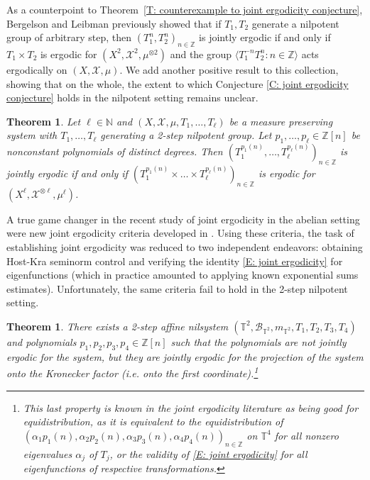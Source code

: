 \documentclass[11pt]{amsart}
\newtheorem{theorem}[lemma]{Theorem}
\theoremstyle{definition}
\newcommand{\N}{{\mathbb N}}
\newcommand{\T}{{\mathbb T}}
\newcommand{\Z}{{\mathbb Z}}
\newcommand{\CB}{{\mathcal B}}
\newcommand{\CX}{{\mathcal X}}
\newcommand{\1}{{\mathbf{1}}}
\begin{document}
As a counterpoint to Theorem~\ref{T: counterexample to joint ergodicity conjecture}, Bergelson and Leibman \cite[Theorem~B]{BL02} previously showed that if $T_{1},T_{2}$ generate a nilpotent group of arbitrary step, then $(T_{1}^{n},T_{2}^{n})_{n\in\Z}$ is jointly ergodic if and only if $T_{1}\times T_{2}$ is ergodic for $(X^{2},\mathcal{X}^{2},\mu^{\otimes 2})$ and the group $\langle T_{1}^{-n}T_{2}^{n}\colon n\in\Z\rangle$ acts ergodically on $(X,\mathcal{X},\mu)$.
We add another positive result to this collection, showing that on the whole, the extent to which Conjecture \ref{C: joint ergodicity conjecture} holds in the nilpotent setting remains unclear. 
\begin{theorem}\label{T: joint ergodicity conjecture2}
    Let $\ell\in\N$ and $(X, \CX, \mu, T_{1},\dots,T_{\ell})$ be a measure preserving system with $T_{1},\dots,T_{\ell}$ generating a 2-step nilpotent group. Let $p_1, \ldots, p_\ell\in\Z[n]$ be nonconstant polynomials of distinct degrees. Then $(T^{p_{1}(n)}_{1},\dots,T^{p_{\ell}(n)}_{\ell})_{n\in\Z}$ is jointly ergodic  if and only if  $(T^{p_{1}(n)}_{1}\times\dots\times T^{p_{\ell}(n)}_{\ell})_{n\in\Z}$ is ergodic for $(X^\ell ,\CX^{\otimes \ell}, \mu^{\ell})$.
\end{theorem}


A true game changer in the recent study of joint ergodicity in the abelian setting were new joint ergodicity criteria developed in \cite{BFM22, Fr21, FrKu22a}. Using these criteria, the task of establishing joint ergodicity was reduced to two independent endeavors: obtaining Host-Kra seminorm control and verifying the identity \eqref{E: joint ergodicity} for eigenfunctions (which in practice amounted to applying known exponential sums estimates). Unfortunately, the same criteria fail to hold in the 2-step nilpotent setting.
\begin{theorem}\label{T: counterexample to joint ergodicity criteria}
    There exists a 2-step affine nilsystem  $(\T^2, \CB_{\T^2}, m_{\T^2}, T_1, T_2, T_3, T_4)$ and polynomials $p_1, p_2, p_3, p_4\in\Z[n]$ such that the polynomials are not jointly ergodic for the system, but they are jointly ergodic for the projection of the system onto the Kronecker factor (i.e. onto the first coordinate).\footnote{This last property is known in the joint ergodicity literature as being \textit{good for equidistribution}, as it is equivalent to the equidistribution of $(\alpha_1 p_1(n), \alpha_2 p_2(n), \alpha_3 p_3(n), \alpha_4 p_4(n))_{n\in\Z}$ on $\T^4$ for all nonzero eigenvalues $\alpha_j$ of $T_j$, or the validity of \eqref{E: joint ergodicity} for all eigenfunctions of respective transformations.}
\end{theorem}
\end{document}
